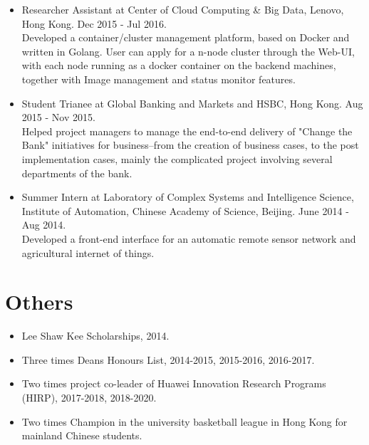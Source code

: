 \documentclass[a4paper,8pt]{article} %
\newcommand{\info}[1]{{\footnotesize \fontfamily{cmss}\selectfont #1}}
\begin{document}
\begin{itemize}
\item Researcher Assistant at Center of Cloud Computing \& Big Data, Lenovo, Hong Kong. Dec 2015 - Jul 2016. \\
\info{Developed a container/cluster management platform, based on Docker and
written in Golang. User can apply for a n-node cluster through the Web-UI, with
each node running as a docker container on the backend machines, together with
Image management and status monitor features.} \\


\item Student Trianee at Global Banking and Markets and HSBC, Hong Kong. Aug 2015 - Nov 2015. \\ 
\info{Helped project managers to manage the end-to-end delivery of "Change the
Bank" initiatives for business--from the creation of business cases, to the post
implementation cases, mainly the complicated project involving several
departments of the bank.}\\


\item Summer Intern at Laboratory of Complex Systems and Intelligence Science,
Institute of Automation, Chinese Academy of Science, Beijing. 
June 2014 - Aug 2014.\\
\info{Developed a front-end interface for an automatic remote sensor network and agricultural internet of things.}
\end{itemize}


\section{Others}
\begin{itemize}
\item Lee Shaw Kee Scholarships, 2014.
\item Three times Deans Honours List, 2014-2015, 2015-2016, 2016-2017. 
\item Two times project co-leader of Huawei Innovation Research Programs (HIRP), 2017-2018, 2018-2020.
\item Two times Champion in the university basketball league in Hong Kong for mainland Chinese students.
\end{itemize}



\end{document}
